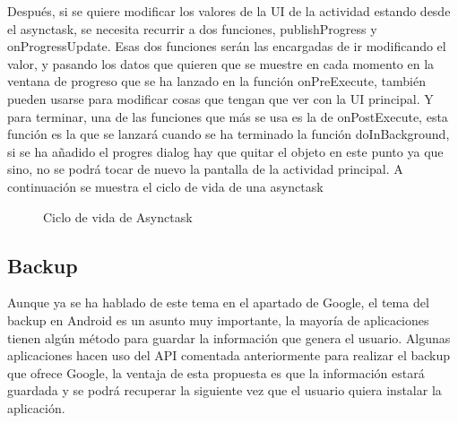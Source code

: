 Después, si se quiere modificar los valores de la UI de la actividad estando desde el asynctask, se necesita recurrir a dos funciones, publishProgress y onProgressUpdate.
Esas dos funciones serán las encargadas de ir modificando el valor, y pasando los datos que quieren que se muestre en cada momento en la ventana de progreso que se ha lanzado en la función onPreExecute, también pueden usarse para modificar cosas que tengan que ver con la UI principal.
Y para terminar, una de las funciones que más se usa es la de onPostExecute, esta función es la que se lanzará cuando se ha terminado  la función doInBackground, si se ha añadido el progres dialog hay que quitar el objeto en este punto ya que sino, no se podrá tocar de nuevo la pantalla de la actividad principal.
A continuación se muestra el ciclo de vida de una asynctask

\begin{figure}[H] 
  \begin{center} 
    \caption{Ciclo de vida de Asynctask} 
    \label{fig:CicloVidaAsynctask} 
  \end{center} 
\end{figure}

\subsection{Backup}
\label{subsecc:Backup}

Aunque ya se ha hablado de este tema en el apartado de Google, el tema del backup en Android es un asunto muy importante, la mayoría de aplicaciones tienen algún método para guardar la información que genera el usuario.
Algunas aplicaciones hacen uso del API comentada anteriormente para realizar el backup que ofrece Google, la ventaja de esta propuesta es que la información estará guardada y se podrá recuperar la siguiente vez que el usuario quiera instalar la aplicación.

